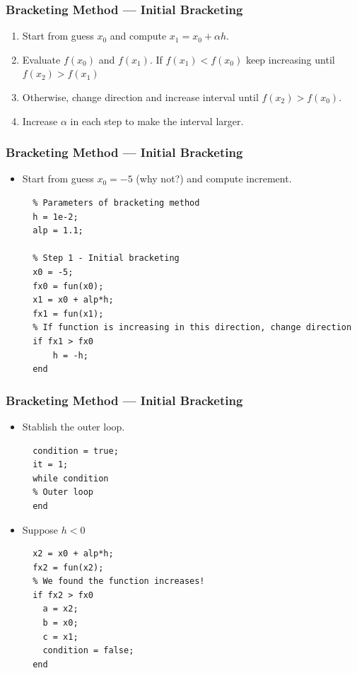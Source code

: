 \documentclass[11pt,xcolor={svgnames},aspectratio=169,usepdftitle=false]{beamer}
\begin{document}
\begin{frame}
  \frametitle{Bracketing Method --- Initial Bracketing}
\begin{enumerate}
  \item Start from guess $x_0$ and compute $x_1 = x_0 + \alpha h$.
  \item Evaluate $f(x_0)$ and $f(x_1)$. If $f(x_1) < f(x_0)$ keep increasing until $f(x_2) > f(x_1)$
  \item Otherwise, change direction and increase interval until $f(x_2) > f(x_0)$.
  \item Increase $\alpha$ in each step to make the interval larger.
\end{enumerate}
\end{frame}

\begin{frame}[fragile]
  \frametitle{Bracketing Method --- Initial Bracketing}
\begin{itemize}
  \item Start from guess $x_0 = -5$ {\tiny (why not?)} and compute increment.
  \begin{lstlisting}
  % Parameters of bracketing method
  h = 1e-2;
  alp = 1.1;
    
  % Step 1 - Initial bracketing
  x0 = -5;
  fx0 = fun(x0);
  x1 = x0 + alp*h;
  fx1 = fun(x1);
  % If function is increasing in this direction, change direction  
  if fx1 > fx0
      h = -h;
  end
  \end{lstlisting}
\end{itemize}
\end{frame}

\begin{frame}[fragile]
  \frametitle{Bracketing Method --- Initial Bracketing}
\begin{itemize}
  \item Stablish the outer loop.
  \begin{lstlisting}
  condition = true;
  it = 1;
  while condition
  % Outer loop
  end
  \end{lstlisting}
  \item Suppose $h < 0$
  \begin{lstlisting}
  x2 = x0 + alp*h; 
  fx2 = fun(x2);
  % We found the function increases!
  if fx2 > fx0
    a = x2;
    b = x0;
    c = x1;
    condition = false;
  end
  \end{lstlisting}
\end{itemize}
\end{frame}
\end{document}
